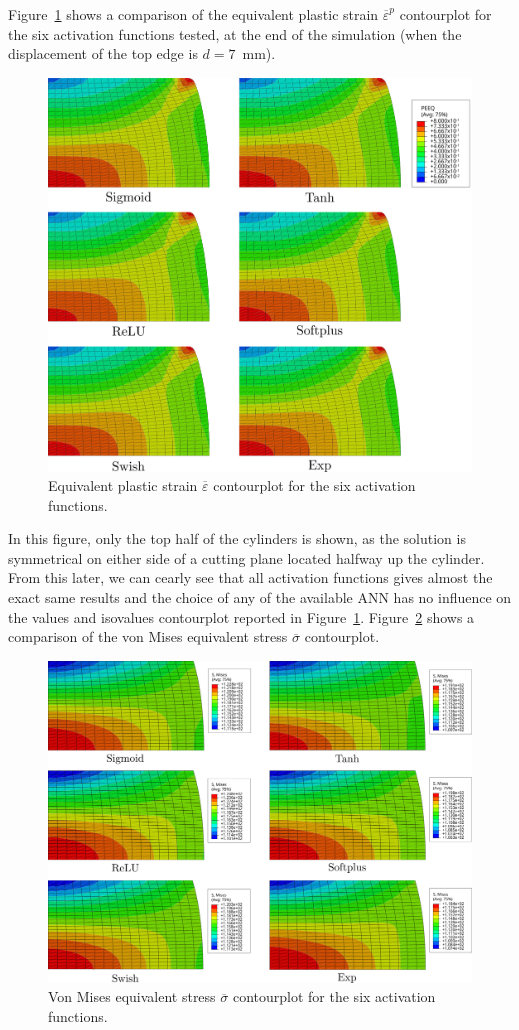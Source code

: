\documentclass[algorithms,article,submit,pdftex,oneauthors]{Definitions/mdpi}
\begin{document}
Figure~\ref{fig:Num-peeqCP} shows a comparison of the equivalent plastic strain $\overline{\varepsilon}^p$ contourplot for the six activation functions tested, at the end of the simulation (when the displacement of the top edge is $d=7$~mm).
\begin{figure}[h!]
\centering
\includegraphics[width=0.8\columnwidth]{Figures/PeeqHalf}
\caption{Equivalent plastic strain $\overline{\varepsilon}$ contourplot for the six activation functions.}
\label{fig:Num-peeqCP}
\end{figure}
In this figure, only the top half of the cylinders is shown, as the solution is symmetrical on either side of a cutting plane located halfway up the cylinder.
From this later, we can cearly see that all activation functions gives almost the exact same results and the choice of any of the available ANN has no influence on the values and isovalues contourplot reported in Figure~\ref{fig:Num-peeqCP}.
Figure~\ref{fig:Num-misesCP} shows a comparison of the von Mises equivalent stress $\overline{\sigma}$ contourplot.
\begin{figure}[h!]
\centering
\includegraphics[width=0.8\columnwidth]{Figures/MisesHalf}
\caption{Von Mises equivalent stress $\overline{\sigma}$ contourplot for the six activation functions.}
\label{fig:Num-misesCP}
\end{figure}
\end{document}

